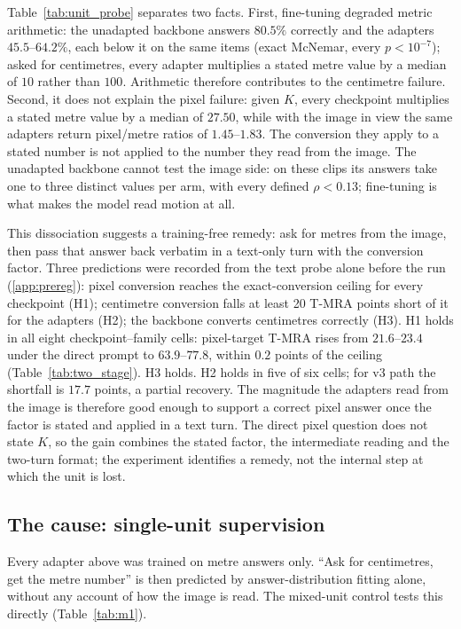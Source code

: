 \documentclass[preprint,number]{elsarticle}
\begin{document}
Table~\ref{tab:unit_probe} separates two facts. First, fine-tuning degraded
metric arithmetic: the unadapted backbone answers $80.5\%$ correctly and the
adapters $45.5$--$64.2\%$, each below it on the same items (exact McNemar,
every $p<10^{-7}$); asked for centimetres, every adapter multiplies a stated
metre value by a median of $10$ rather than $100$. Arithmetic therefore
contributes to the centimetre failure. Second, it does not explain the pixel
failure: given $K$, every checkpoint multiplies a stated metre value by a median
of $27.50$, while with the image in view the same adapters return pixel/metre
ratios of $1.45$--$1.83$. The conversion they apply to a stated number is not
applied to the number they read from the image. The unadapted backbone cannot
test the image side: on these clips its answers take one to three distinct
values per arm, with every defined $\rho<0.13$; fine-tuning is what makes the
model read motion at all.



This dissociation suggests a training-free remedy: ask for metres from the
image, then pass that answer back verbatim in a text-only turn with the
conversion factor. Three predictions were recorded from the text probe alone
before the run (\ref{app:prereg}): pixel conversion reaches the exact-conversion
ceiling for every checkpoint (H1); centimetre conversion falls at least 20 T-MRA
points short of it for the adapters (H2); the backbone converts centimetres
correctly (H3). H1 holds in all eight checkpoint--family cells: pixel-target
T-MRA rises from $21.6$--$23.4$ under the direct prompt to $63.9$--$77.8$,
within $0.2$ points of the ceiling (Table~\ref{tab:two_stage}). H3 holds. H2
holds in five of six cells; for v3 path the shortfall is $17.7$ points, a partial
recovery. The magnitude the adapters read from the image is therefore good
enough to support a correct pixel answer once the factor is stated and applied
in a text turn. The direct pixel question does not state $K$, so the gain
combines the stated factor, the intermediate reading and the two-turn format;
the experiment identifies a remedy, not the internal step at which the unit is
lost.



\subsection{The cause: single-unit supervision}
\label{sec:m1}

Every adapter above was trained on metre answers only. ``Ask for centimetres,
get the metre number'' is then predicted by answer-distribution fitting alone,
without any account of how the image is read. The mixed-unit control tests this
directly (Table~\ref{tab:m1}).
\end{document}
